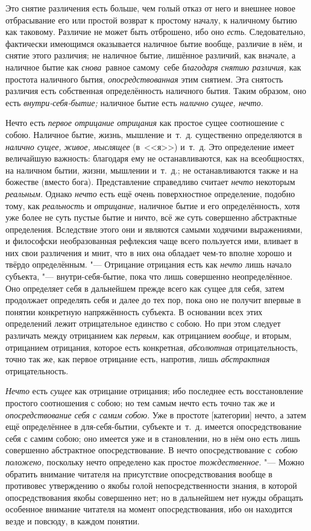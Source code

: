 Это снятие различения есть больше, чем голый отказ от него и внешнее новое
отбрасывание его или простой возврат к простому началу, к наличному бытию как
таковому. Различие не может быть отброшено, ибо оно {\em есть}. Следовательно,
фактически имеющимся оказывается наличное бытие вообще, различие в нём,
и снятие этого различия; не наличное бытие, лишённое различий, как вначале,
а наличное бытие как {\em снова}~равное самому~себе
{\em благодаря снятию различия,} как простота наличного бытия,
{\em опосредствованная} этим снятием. Эта снятость различия есть
собственная определённость наличного бытия. Таким образом, оно есть
{\em внутри-себя-бытие;} наличное бытие есть {\em налично сущее, нечто}.

Нечто есть {\em первое отрицание отрицания} как простое
сущее соотношение с собою. Наличное бытие, жизнь, мышление и~т.~д.
существенно определяются в {\em налично сущее,}
{\em живое, мыслящее} (в~<<я>>)
и~т.~д. Это определение имеет величайшую важность: благодаря ему не
останавливаются, как на всеобщностях, на наличном бытии, жизни, мышлении
и~т.~д.; не останавливаются также и на божестве (вместо бога).
Представление справедливо считает {\em нечто} некоторым
{\em реальным}. Однако {\em нечто}
есть ещё очень поверхностное определение, подобно тому, как
{\em реальность} и {\em отрицание,}
наличное бытие и его определённость, хотя уже более не суть пустые бытие и
ничто, всё же суть совершенно абстрактные определения. Вследствие этого они
и являются самыми ходячими выражениями, и философски необразованная
рефлексия чаще всего пользуется ими, вливает в них свои различения и мнит,
что в них она обладает чем-то вполне хорошо и твёрдо определённым. "---
Отрицание отрицания есть как {\em нечто} лишь начало
субъекта, "--- внутри-себя-бытие, пока что лишь совершенно неопределённое. Оно
определяет себя в дальнейшем прежде всего как сущее для себя, затем
продолжает определять себя и далее до тех пор, пока оно не получит впервые
в понятии конкретную напряжённость субъекта. В основании всех этих
определений лежит отрицательное единство с собою. Но при этом следует
различать между отрицанием как {\em первым,} как
отрицанием {\em вообще,} и вторым, отрицанием
отрицания, которое есть конкретная, {\em абсолютная}
отрицательность, точно так же, как первое отрицание есть, напротив, лишь
{\em абстрактная} отрицательность.

{\em Нечто} есть {\em сущее} как отрицание отрицания; ибо последнее есть
восстановление простого соотношения с собою; но тем самым нечто есть точно так
же и {\em опосредствование себя с самим собою}. Уже в простоте [категории]
нечто, а затем ещё определённее в для-себя-бытии, субъекте и~т.~д. имеется
опосредствование себя с самим собою; оно имеется уже и в становлении, но в нём
оно есть лишь совершенно абстрактное опосредствование. В нечто опосредствование
с~{\em собою положено,} поскольку нечто определено как простое
{\em тождественное}. "--- Можно обратить внимание читателя на присутствие
опосредствования вообще в противовес утверждению о якобы голой
непосредственности знания, в которой опосредствования якобы совершенно нет; но
в дальнейшем нет нужды обращать особенное внимание читателя на момент
опосредствования, ибо он находится везде и повсюду, в каждом понятии.

